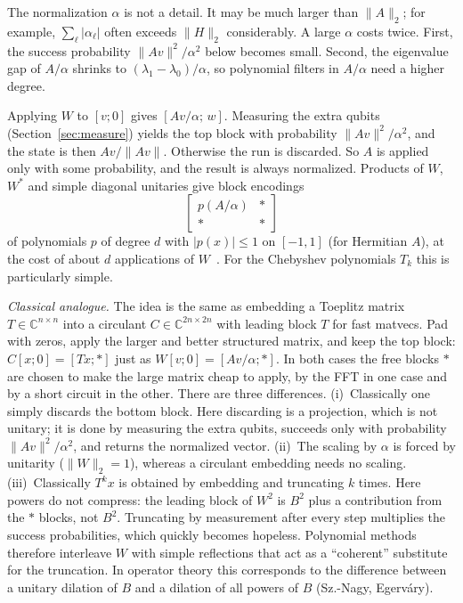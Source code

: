 \documentclass[11pt,a4paper]{article}
\newcommand{\C}{\mathbb{C}}
\begin{document}
The normalization $\alpha$ is not a detail. It may be much larger than
$\|A\|_2$; for example, $\sum_\ell|\alpha_\ell|$ often exceeds $\|H\|_2$
considerably. A large $\alpha$ costs twice. First, the success probability
$\|Av\|^2/\alpha^2$ below becomes small. Second, the eigenvalue gap of
$A/\alpha$ shrinks to $(\lambda_1-\lambda_0)/\alpha$, so polynomial filters in
$A/\alpha$ need a higher degree.

Applying $W$ to $[v;0]$ gives
$[Av/\alpha;\,w]$. Measuring the extra qubits
(Section~\ref{sec:measure}) yields the top block with probability
$\|Av\|^2/\alpha^2$, and the state is then $Av/\|Av\|$. Otherwise the
run is discarded. So $A$ is applied only with some probability, and the
result is always normalized. Products of $W$, $W^*$ and simple diagonal
unitaries give block encodings
\[
  \begin{bmatrix} p(A/\alpha) & *\\ * & *\end{bmatrix}
\]
of polynomials $p$ of degree $d$ with $|p(x)|\le1$ on $[-1,1]$ (for
Hermitian $A$), at the cost of about $d$ applications of
$W$~\cite{GSLW19}. For the Chebyshev polynomials $T_k$ this is
particularly simple.

\emph{Classical analogue.} The idea is the same as embedding a Toeplitz
matrix $T\in\C^{n\times n}$ into a circulant $C\in\C^{2n\times2n}$ with leading block
$T$ for fast matvecs. Pad with zeros, apply the larger and better
structured matrix, and keep the top block: $C[x;0]=[Tx;*]$ just as
$W[v;0]=[Av/\alpha;*]$. In both cases the free blocks $*$ are chosen to make
the large matrix cheap to apply, by the FFT in one case and by a short
circuit in the other. There are three differences.
(i)~Classically one simply discards the bottom block. Here discarding is
a projection, which is not unitary; it is done by measuring the extra
qubits, succeeds only with probability $\|Av\|^2/\alpha^2$, and returns the
normalized vector.
(ii)~The scaling by $\alpha$ is forced by unitarity ($\|W\|_2=1$), whereas a
circulant embedding needs no scaling.
(iii)~Classically $T^kx$ is obtained by embedding and truncating $k$
times. Here powers do not compress: the leading block of $W^2$ is
$B^2$ plus a contribution from the $*$ blocks, not $B^2$. Truncating by
measurement after every step multiplies the success probabilities, which
quickly becomes hopeless. Polynomial methods~\cite{GSLW19} therefore
interleave $W$ with simple reflections that act as a ``coherent''
substitute for the truncation. In operator theory this corresponds to
the difference between a unitary dilation of $B$ and a dilation of
all powers of $B$ (Sz.-Nagy, Egerv\'ary).
\end{document}
